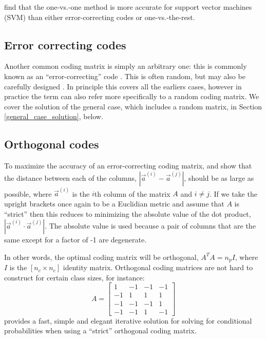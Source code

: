 \documentclass{article}
\newenvironment{eqnnon}{\begin{equation*}}{\end{equation*}}
\begin{document}
\citet{Hsu_Lin2002} find that the one-vs.-one method is more accurate
for support vector machines (SVM) than either
error-correcting codes or one-vs.-the-rest.

\subsection{Error correcting codes}

Another common coding matrix is simply an arbitrary one: this is commonly
known as an ``error-correcting'' code \citep{Dietterich_Bakiri1995}.
This is often random, but may also be carefully designed 
\citep{Crammer_Singer2002}.
In principle this covers all the earliers cases, however in practice the
term can also refer more specifically to a random coding matrix.
We cover the solution of the general case, which includes a random
matrix, in Section \ref{general_case_solution}, below.

\subsection{Orthogonal codes}

\label{orthogonal}

To maximize the accuracy of an error-correcting coding matrix, 
\citet{Allwein_etal2000} and \citet{Windeatt_Ghaderi2002} show that
the distance between each of the columns, $| \vec a^{(i)} - \vec a^{(j)} |$, 
should be as large as possible,
where $\vec a^({i})$ is the $i$th column of the matrix $A$ and $i \ne j$. 
If we take the upright brackets once again to be a
Euclidian metric and assume that $A$ is ``strict'' then this 
reduces to minimizing the absolute value of the dot product,
$|\vec a^{(i)} \cdot \vec a^{(j)}|$.
The absolute value is used because a pair of columns that are the same except 
for a factor of -1 are degenerate.

In other words, 
the optimal coding matrix will be orthogonal, $A^T A = n_p I$, where $I$ is
the $[n_c\times n_c]$ identity matrix. 
Orthogonal coding matrices 
are not hard to construct for certain class sizes, for instance:
\begin{eqnnon}
A = 
\begin{bmatrix}
1 & -1 & -1 & -1 \\
-1 & 1 & 1 & 1 \\
-1 & -1 & -1 & 1 \\
-1 & -1 & 1 & -1
\end{bmatrix}
\end{eqnnon}
\citet{Mills2017} provides a fast, simple and elegant iterative solution for solving
for conditional probabilities when using a ``strict'' orthogonal coding matrix.
\end{document}
